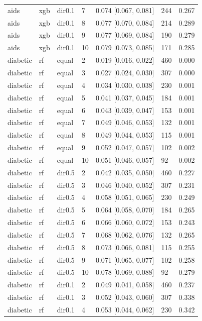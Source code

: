 \begin{tabular}{lllllll}
aids & xgb & dir0.1 & 7 & 0.074 [0.067, 0.081] & 244 & 0.267 \\
aids & xgb & dir0.1 & 8 & 0.077 [0.070, 0.084] & 214 & 0.289 \\
aids & xgb & dir0.1 & 9 & 0.077 [0.069, 0.084] & 190 & 0.279 \\
aids & xgb & dir0.1 & 10 & 0.079 [0.073, 0.085] & 171 & 0.285 \\
\addlinespace
diabetic & rf & equal & 2 & 0.019 [0.016, 0.022] & 460 & 0.000 \\
diabetic & rf & equal & 3 & 0.027 [0.024, 0.030] & 307 & 0.000 \\
diabetic & rf & equal & 4 & 0.034 [0.030, 0.038] & 230 & 0.001 \\
diabetic & rf & equal & 5 & 0.041 [0.037, 0.045] & 184 & 0.001 \\
diabetic & rf & equal & 6 & 0.043 [0.039, 0.047] & 153 & 0.001 \\
diabetic & rf & equal & 7 & 0.049 [0.046, 0.053] & 132 & 0.001 \\
diabetic & rf & equal & 8 & 0.049 [0.044, 0.053] & 115 & 0.001 \\
diabetic & rf & equal & 9 & 0.052 [0.047, 0.057] & 102 & 0.002 \\
diabetic & rf & equal & 10 & 0.051 [0.046, 0.057] & 92 & 0.002 \\
diabetic & rf & dir0.5 & 2 & 0.042 [0.035, 0.050] & 460 & 0.227 \\
diabetic & rf & dir0.5 & 3 & 0.046 [0.040, 0.052] & 307 & 0.231 \\
diabetic & rf & dir0.5 & 4 & 0.058 [0.051, 0.065] & 230 & 0.249 \\
diabetic & rf & dir0.5 & 5 & 0.064 [0.058, 0.070] & 184 & 0.265 \\
diabetic & rf & dir0.5 & 6 & 0.066 [0.060, 0.072] & 153 & 0.243 \\
diabetic & rf & dir0.5 & 7 & 0.068 [0.062, 0.076] & 132 & 0.265 \\
diabetic & rf & dir0.5 & 8 & 0.073 [0.066, 0.081] & 115 & 0.255 \\
diabetic & rf & dir0.5 & 9 & 0.071 [0.065, 0.077] & 102 & 0.258 \\
diabetic & rf & dir0.5 & 10 & 0.078 [0.069, 0.088] & 92 & 0.279 \\
diabetic & rf & dir0.1 & 2 & 0.049 [0.041, 0.058] & 460 & 0.237 \\
diabetic & rf & dir0.1 & 3 & 0.052 [0.043, 0.060] & 307 & 0.338 \\
diabetic & rf & dir0.1 & 4 & 0.053 [0.044, 0.062] & 230 & 0.342 \\

\end{tabular}
